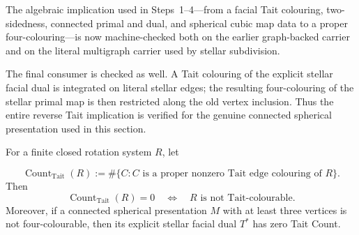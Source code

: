 The algebraic implication used in Steps~1--4---from a facial Tait colouring,
two-sidedness, connected primal and dual, and spherical cubic map data to a
proper four-colouring---is now machine-checked both on the earlier
graph-backed carrier and on the literal multigraph carrier used by stellar
subdivision.

The final consumer is checked as well.  A Tait colouring of the explicit
stellar facial dual is integrated on literal stellar edges; the resulting
four-colouring of the stellar primal map is then restricted along the old
vertex inclusion.  Thus the entire reverse Tait implication is verified for
the genuine connected spherical presentation used in this section.

\begin{proposition}
\label{prop:stellar-zero-count-entry}
For a finite closed rotation system \(R\), let

\[
 \operatorname{Count}_{\mathrm{Tait}}(R)
 :=\#\{C:C\text{ is a proper nonzero Tait edge colouring of }R\}.
\]
Then
\[
 \operatorname{Count}_{\mathrm{Tait}}(R)=0
 \quad\Longleftrightarrow\quad
 R\text{ is not Tait-colourable}.
\]
Moreover, if a connected spherical presentation \(M\) with at least three
vertices is not four-colourable, then its explicit stellar facial dual
\(T^{*}\) has zero Tait Count.
\end{proposition}

